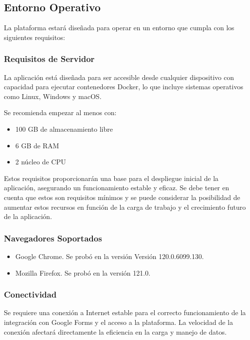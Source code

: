 \subsection{Entorno Operativo}

La plataforma estará diseñada para operar en un entorno que cumpla con los siguientes requisitos:

\subsubsection{Requisitos de Servidor}
La aplicación está diseñada para ser accesible desde cualquier dispositivo con capacidad para ejecutar contenedores Docker, lo que incluye sistemas operativos como Linux, Windows y macOS.

Se recomienda empezar al menos con:
\begin{itemize}
    \item 100 GB de almacenamiento libre
    \item 6 GB de RAM
    \item 2 núcleo de CPU
\end{itemize}

Estos requisitos proporcionarán una base para el despliegue inicial de la aplicación, asegurando un funcionamiento estable y eficaz. Se debe tener en cuenta que estos son requisitos mínimos y se puede considerar la posibilidad de aumentar estos recursos en función de la carga de trabajo y el crecimiento futuro de la aplicación.

\subsubsection{Navegadores Soportados}

\begin{itemize}
    \item Google Chrome. Se probó en la versión Versión 120.0.6099.130.
    \item Mozilla Firefox. Se probó en la versión 121.0.
\end{itemize}

\subsubsection{Conectividad}
Se requiere una conexión a Internet estable para el correcto funcionamiento de la integración con Google Forms y el acceso a la plataforma. La velocidad de la conexión afectará directamente la eficiencia en la carga y manejo de datos.

